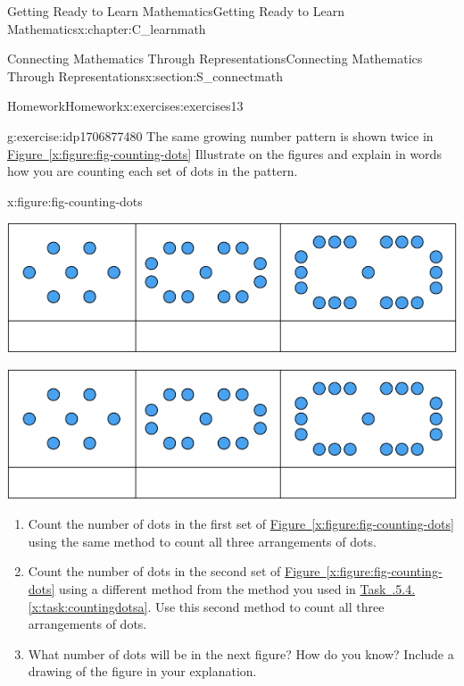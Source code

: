 \documentclass[oneside,10pt,]{book}
\newcommand{\xreffont}{\relax}
\numberwithin{equation}{chapter}
\begin{document}
\begin{chapterptx}{Getting Ready to Learn Mathematics}{}{Getting Ready to Learn Mathematics}{}{}{x:chapter:C_learnmath}
\begin{sectionptx}{Connecting Mathematics Through Representations}{}{Connecting Mathematics Through Representations}{}{}{x:section:S_connectmath}
\begin{exercises-subsection}{Homework}{}{Homework}{}{}{x:exercises:exercises13}
\begin{divisionexercise}{4}{}{}{g:exercise:idp1706877480}
The same growing number pattern is shown twice in \hyperref[x:figure:fig-counting-dots]{Figure~{\xreffont\ref{x:figure:fig-counting-dots}}} Illustrate on the figures and explain in words how you are counting each set of dots in the pattern.%
\begin{figureptx}{}{x:figure:fig-counting-dots}{}%
\begin{image}{0.15}{0.7}{0.15}%
\includegraphics[width=\linewidth]{external/counting-dots.pdf}
\end{image}%
\begin{image}{0.15}{0.7}{0.15}%
\includegraphics[width=\linewidth]{external/counting-dots.pdf}
\end{image}%
\tcblower
\end{figureptx}%
\begin{enumerate}[font=\bfseries,label=(\alph*),ref=\alph*]
\item\label{x:task:countingdotsa}Count the number of dots in the first set of \hyperref[x:figure:fig-counting-dots]{Figure~{\xreffont\ref{x:figure:fig-counting-dots}}} using the same method to count all three arrangements of dots.%
\item{}Count the number of dots in the second set of \hyperref[x:figure:fig-counting-dots]{Figure~{\xreffont\ref{x:figure:fig-counting-dots}}} using a different method from the method you used in \hyperref[x:task:countingdotsa]{Task~{\xreffont 1.3.5.4}.{\xreffont\ref{x:task:countingdotsa}}}. Use this second method to count all three arrangements of dots.%
\item{}What number of dots will be in the next figure? How do you know? Include a drawing of the figure in your explanation.%
\end{enumerate}
\end{divisionexercise}%

\end{exercises-subsection}
\end{sectionptx}
\end{chapterptx}
\end{document}
